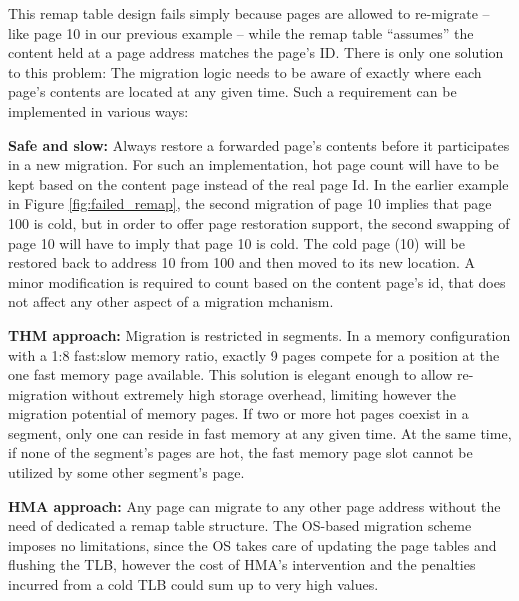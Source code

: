 This remap table design fails simply because pages are allowed to re-migrate -- like page 10 in our previous example -- while the remap table ``assumes'' the content held at a page address matches the page's ID.  There is only one solution to this problem: The migration logic needs to be aware of exactly where each page's contents are located at any given time. Such a requirement can be implemented in various ways:

	\textbf{Safe and slow:} Always restore a forwarded page's contents before it participates in a new migration. For such an implementation, hot page count will have to be kept based on the content page instead of the real page Id. In the earlier example in Figure \ref{fig:failed_remap}, the second migration of page 10 implies that page 100 is cold, but in order to offer page restoration support, the second swapping of page 10 will have to imply that page 10 is cold. The cold page (10) will be restored back to address 10 from 100 and then moved to its new location. A minor modification is required to count based on the content page's id, that does not affect any other aspect of a migration mchanism.

	\textbf{THM approach:} Migration is restricted in segments. In a memory configuration with a 1:8 fast:slow memory ratio, exactly 9 pages compete for a position at the one fast memory page available. This solution is elegant enough to allow re-migration without extremely high storage overhead, limiting however the migration potential of memory pages. If two or more hot pages coexist in a segment, only one can reside in fast memory at any given time. At the same time, if none of the segment's pages are hot, the fast memory page slot cannot be utilized by some other segment's page.

	\textbf{HMA approach:} Any page can migrate to any other page address without the need of dedicated a remap table structure. The OS-based migration scheme imposes no limitations, since the OS takes care of updating the page tables and flushing the TLB, however the cost of HMA's intervention and the penalties incurred from a cold TLB could sum up to very high values.

